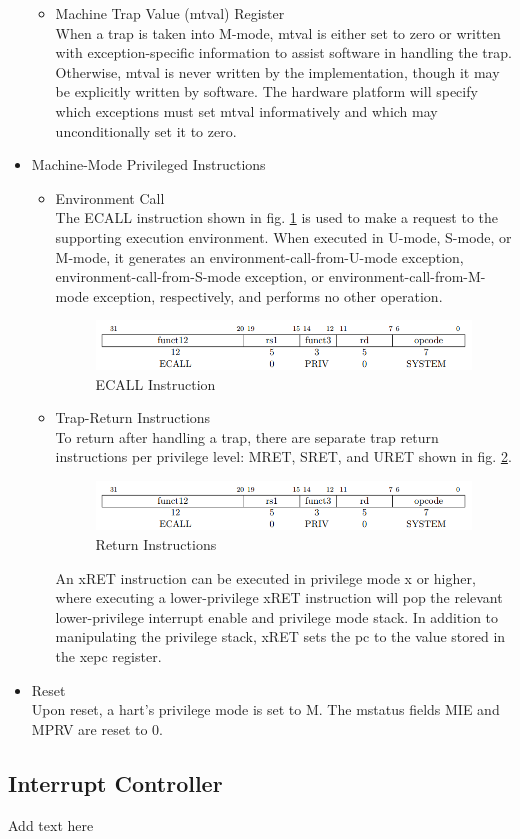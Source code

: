 \documentclass[../main.tex]{subfiles}
\begin{document}
\begin{itemize}
\begin{itemize}
            \item Machine Trap Value (mtval) Register\\
            When a trap is taken into M-mode, mtval is either set to zero or written with exception-specific information to assist software in handling the trap. Otherwise, mtval is never written by the implementation, though it may be explicitly written by software. The hardware platform will specify which exceptions must set mtval informatively and which may unconditionally set it to zero.
        \end{itemize}
        
    \item[2- ]Machine-Mode Privileged Instructions
        \begin{itemize}
            \item Environment Call\\
            The ECALL instruction shown in fig. \ref{fig:ecall} is used to make a request to the supporting execution environment. When executed in U-mode, S-mode, or M-mode, it generates an environment-call-from-U-mode exception, environment-call-from-S-mode exception, or environment-call-from-M-mode exception, respectively, and performs no other operation.\\
            \begin{figure}[h!]
            \centering
            \includegraphics[width=10 cm]{diagrams/ecall.png}
            \caption{ECALL Instruction}
            \label{fig:ecall}
            \end{figure}
            
            \item Trap-Return Instructions\\
            To return after handling a trap, there are separate trap return instructions per privilege level: MRET, SRET, and URET shown in fig. \ref{fig:ret}.\\
            \begin{figure}[h!]
            \centering
            \includegraphics[width=10 cm]{diagrams/ecall.png}
            \caption{Return Instructions}
            \label{fig:ret}
            \end{figure}An xRET instruction can be executed in privilege mode x or higher, where executing a lower-privilege xRET instruction will pop the relevant lower-privilege interrupt enable and privilege mode stack. In addition to manipulating the privilege stack, xRET sets the pc to the value stored in the xepc register.
        \end{itemize}
    \item[3- ]Reset\\
    Upon reset, a hart’s privilege mode is set to M. The mstatus fields MIE and MPRV are reset to 0.
\end{itemize}




\subsection{Interrupt Controller}
Add text here
\end{document}
